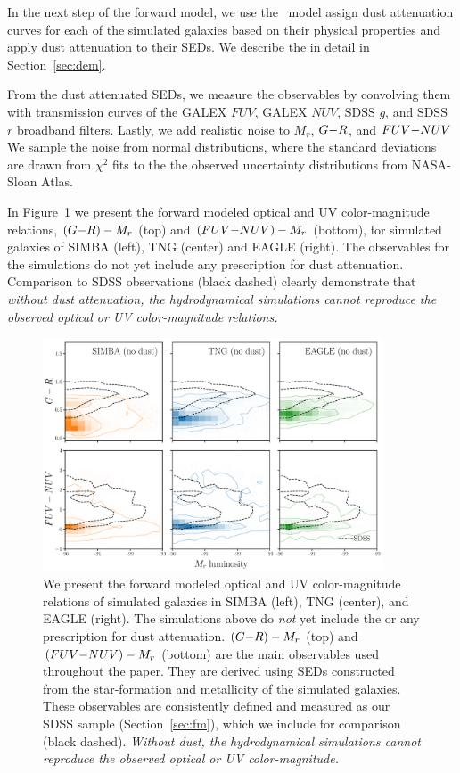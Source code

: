 In the next step of the forward model, we use the \eda~model assign dust 
attenuation curves for each of the simulated galaxies based on their physical
properties and apply dust attenuation to their SEDs. We describe the \eda in
detail in Section~\ref{sec:dem}. 

From the dust attenuated SEDs, we measure the observables by convolving them
with transmission curves of the GALEX $FUV$, GALEX $NUV$, SDSS $g$, and SDSS $r$
broadband filters. Lastly, we add realistic noise to $M_r$, $G{-}R$, and $FUV{-}NUV$ 
We sample the noise from normal distributions, where the standard deviations 
are drawn from $\chi^2$ fits to the the observed uncertainty distributions from 
NASA-Sloan Atlas.

In Figure~\ref{fig:obs} we present the forward modeled optical and UV color-magnitude
relations, $(G{-}R)-M_r$ (top) and $(FUV{-}NUV)-M_r$ (bottom), for simulated galaxies
of SIMBA (left), TNG (center) and EAGLE (right). The observables for the
simulations do not yet include any prescription for dust attenuation.
Comparison to SDSS observations (black dashed) clearly demonstrate
that {\em without dust attenuation, the hydrodynamical simulations cannot
reproduce the observed optical or UV color-magnitude relations.}

\begin{figure}
\begin{center}
\includegraphics[width=0.9\textwidth]{figs/observables.pdf} 
    \caption{\label{fig:obs}
    We present the forward modeled optical and UV color-magnitude relations of 
    simulated galaxies in SIMBA (left), TNG (center), and EAGLE (right). The
    simulations above do {\em not} yet include the \eda or any prescription for
    dust attenuation.  $(G{-}R)-M_r$ (top) and $(FUV{-}NUV)-M_r$ (bottom) are the
    main observables used throughout the paper. They are derived using SEDs
    constructed from the star-formation and metallicity of the simulated
    galaxies. These observables are consistently defined and measured as our
    SDSS sample (Section~\ref{sec:fm}), which we include for comparison (black
    dashed). {\em Without dust, the hydrodynamical simulations cannot reproduce
    the observed optical or UV color-magnitude.}
    }
\end{center}
\end{figure}
